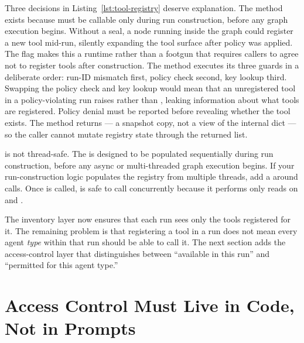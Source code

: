 Three decisions in Listing~\ref{lst:tool-registry} deserve explanation.
The  method exists because  must be callable
only during run construction, before any graph execution begins. Without a
seal, a node running inside the graph could register a new tool mid-run,
silently expanding the tool surface after policy was applied. The
 flag makes this a runtime  rather than a
footgun that requires callers to agree not to register tools after
construction. The  method executes its three guards in a
deliberate order: run-ID mismatch first, policy check second, key lookup
third. Swapping the policy check and key lookup would mean that an
unregistered tool in a policy-violating run raises  rather
than , leaking information about what tools are
registered. Policy denial must be reported before revealing whether the
tool exists. The  method returns
 --- a snapshot copy, not a view of the
internal dict --- so the caller cannot mutate registry state through the
returned list.

\begin{warningbox}
 is not thread-safe. The  is designed
to be populated sequentially during run construction, before any async or
multi-threaded graph execution begins. If your run-construction logic
populates the registry from multiple threads, add a 
around  calls. Once  is called,
 is safe to call concurrently because it performs only
reads on  and .
\end{warningbox}

The inventory layer now ensures that each run sees only the tools
registered for it. The remaining problem is that registering a tool in a
run does not mean every agent \emph{type} within that run should be able to
call it. The next section adds the access-control layer that distinguishes
between ``available in this run'' and ``permitted for this agent type.''


\section{Access Control Must Live in Code, Not in Prompts}
\label{sec:tool-policy}

